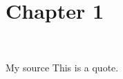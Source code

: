 \chapter{Chapter 1}
\blindtext[2]\\

\begin{uquote}{My source}
	This is a quote.
\end{uquote}

\blindtext %